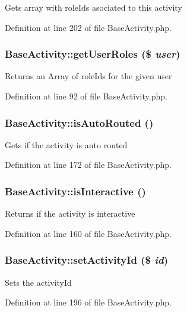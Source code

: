 Gets array with role\-Ids asociated to this activity 

Definition at line 202 of file Base\-Activity.php.
\subsubsection{\setlength{\rightskip}{0pt plus 5cm}Base\-Activity::get\-User\-Roles (\$ {\em user})}\label{classBaseActivity_a3}


Returns an Array of role\-Ids for the given user 

Definition at line 92 of file Base\-Activity.php.
\subsubsection{\setlength{\rightskip}{0pt plus 5cm}Base\-Activity::is\-Auto\-Routed ()}\label{classBaseActivity_a14}


Gets if the activity is auto routed 

Definition at line 172 of file Base\-Activity.php.
\subsubsection{\setlength{\rightskip}{0pt plus 5cm}Base\-Activity::is\-Interactive ()}\label{classBaseActivity_a12}


Returns if the activity is interactive 

Definition at line 160 of file Base\-Activity.php.
\subsubsection{\setlength{\rightskip}{0pt plus 5cm}Base\-Activity::set\-Activity\-Id (\$ {\em id})}\label{classBaseActivity_a18}


Sets the activity\-Id 

Definition at line 196 of file Base\-Activity.php.
